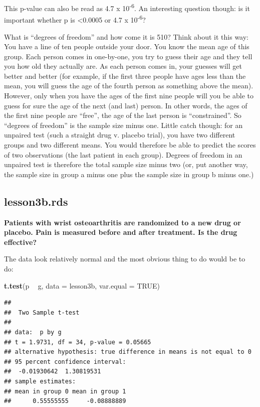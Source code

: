 \documentclass[]{book}
\newenvironment{Shaded}{\begin{snugshade}}{\end{snugshade}}
\newcommand{\DataTypeTok}[1]{\textcolor[rgb]{0.13,0.29,0.53}{#1}}
\newcommand{\KeywordTok}[1]{\textcolor[rgb]{0.13,0.29,0.53}{\textbf{#1}}}
\newcommand{\NormalTok}[1]{#1}
\newcommand{\OperatorTok}[1]{\textcolor[rgb]{0.81,0.36,0.00}{\textbf{#1}}}
\newcommand{\OtherTok}[1]{\textcolor[rgb]{0.56,0.35,0.01}{#1}}
\newcommand{\StringTok}[1]{\textcolor[rgb]{0.31,0.60,0.02}{#1}}
\begin{document}
This p-value can also be read as 4.7 x 10\textsuperscript{-6}. An
interesting question though: is it important whether p is
\textless0.0005 or 4.7 x 10\textsuperscript{-6}?

What is ``degrees of freedom'' and how come it is 510? Think about it
this way: You have a line of ten people outside your door. You know the
mean age of this group. Each person comes in one-by-one, you try to
guess their age and they tell you how old they actually are. As each
person comes in, your guesses will get better and better (for example,
if the first three people have ages less than the mean, you will guess
the age of the fourth person as something above the mean). However, only
when you have the ages of the first nine people will you be able to
guess for sure the age of the next (and last) person. In other words,
the ages of the first nine people are ``free'', the age of the last
person is ``constrained''. So ``degrees of freedom'' is the sample size
minus one. Little catch though: for an unpaired test (such a straight
drug v. placebo trial), you have two different groups and two different
means. You would therefore be able to predict the scores of two
observations (the last patient in each group). Degrees of freedom in an
unpaired test is therefore the total sample size minus two (or, put
another way, the sample size in group a minus one plus the sample size
in group b minus one.)

\hypertarget{lesson3b.rds}{%
\subsection{lesson3b.rds}\label{lesson3b.rds}}

\textbf{Patients with wrist osteoarthritis are randomized to a new drug
or placebo. Pain is measured before and after treatment. Is the drug
effective?}

The data look relatively normal and the most obvious thing to do would
be to do:

\begin{Shaded}
\begin{Highlighting}[]
\KeywordTok{t.test}\NormalTok{(p }\OperatorTok{~}\StringTok{ }\NormalTok{g, }\DataTypeTok{data =}\NormalTok{ lesson3b, }\DataTypeTok{var.equal =} \OtherTok{TRUE}\NormalTok{)}
\end{Highlighting}
\end{Shaded}

\begin{verbatim}
## 
##  Two Sample t-test
## 
## data:  p by g
## t = 1.9731, df = 34, p-value = 0.05665
## alternative hypothesis: true difference in means is not equal to 0
## 95 percent confidence interval:
##  -0.01930642  1.30819531
## sample estimates:
## mean in group 0 mean in group 1 
##      0.55555555     -0.08888889
\end{verbatim}
\end{document}
